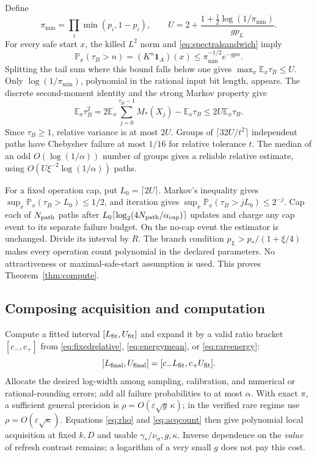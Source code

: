 \documentclass[10pt,a4paper]{article}
\theoremstyle{definition}\newtheorem{assumption}[theorem]{Assumption}
\newcommand{\E}{\mathbb E}
\newcommand{\Prob}{\mathbb P}
\newcommand{\one}{\mathbf 1}
\newcommand{\eps}{\varepsilon}
\begin{document}
Define
\begin{equation}
 \pi_{\min}=\prod_i\min(p_i,1-p_i),\qquad
 U=2+\frac{1+\tfrac12\log(1/\pi_{\min})}{g p_L}.
 \label{eq:nonrareU}
\end{equation}
For every safe start $x$, the killed $L^2$ norm and \eqref{eq:spectralsandwich} imply
\[
 \Prob_x(\tau_B>n)
 =(K^n\one_A)(x)\le\pi_{\min}^{-1/2}e^{-gpn}.
\]
Splitting the tail sum where this bound falls below one gives
$\max_x\E_x\tau_B\le U$.
Only $\log(1/\pi_{\min})$, polynomial in the rational input bit length, appears.
The discrete second-moment identity and the strong Markov property give
\begin{equation}
 \E_x\tau_B^2
 =2\E_x\sum_{j=0}^{\tau_B-1}M_*(X_j)-\E_x\tau_B
 \le2U\E_x\tau_B.
 \label{eq:secondmoment}
\end{equation}
Since $\tau_B\ge1$, relative variance is at most $2U$. Groups of $\lceil32U/t^2\rceil$ independent paths have Chebyshev failure at most $1/16$ for relative tolerance $t$. The median of an odd $O(\log(1/\alpha))$ number of groups gives a reliable relative estimate, using $O(U\xi^{-2}\log(1/\alpha))$ paths.

For a fixed operation cap, put $L_0=\lceil2U\rceil$. Markov's inequality gives
$\sup_x\Prob_x(\tau_B>L_0)\le1/2$, and iteration gives
$\sup_x\Prob_x(\tau_B>jL_0)\le2^{-j}$.
Cap each of $N_{\rm path}$ paths after
$L_0\lceil\log_2(4N_{\rm path}/\alpha_{\rm cap})\rceil$ updates and charge any cap event to its separate failure budget. On the no-cap event the estimator is unchanged. Divide its interval by $R$.
The branch condition $p_L>p_* /(1+\xi/4)$ makes every operation count polynomial in the declared parameters. No attractiveness or maximal-safe-start assumption is used. This proves Theorem~\ref{thm:compute}.

\subsection{Composing acquisition and computation}

Compute a fitted interval $[L_{\rm fit},U_{\rm fit}]$ and expand it by a valid ratio bracket $[c_-,c_+]$ from \eqref{eq:fixedrelative}, \eqref{eq:energymean}, or \eqref{eq:rareenergy}:
\[
 [L_{\rm final},U_{\rm final}]=[c_-L_{\rm fit},c_+U_{\rm fit}].
\]
Allocate the desired log-width among sampling, calibration, and numerical or rational-rounding errors; add all failure probabilities to at most $\alpha$. With exact $\pi$, a sufficient general precision is $\rho=O(\eps\sqrt g\,\kappa)$; in the verified rare regime use $\rho=O(\eps\sqrt\kappa)$. Equations \eqref{eq:rho} and \eqref{eq:acqcount} then give polynomial local acquisition at fixed $k,D$ and usable $\gamma_*/\nu_\alpha,g,\kappa$. Inverse dependence on the \emph{value} of refresh contrast remains; a logarithm of a very small $g$ does not pay this cost.
\end{document}
